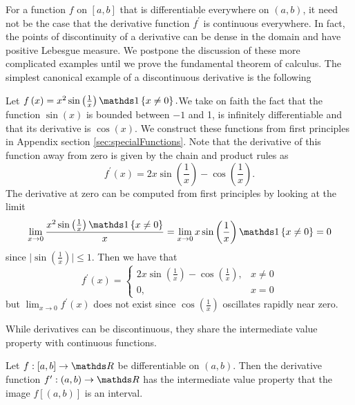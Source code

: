 For a function $f$ on $\left[a,b\right]$ that is differentiable
everywhere on $\left(a,b\right)$, it need not be the case that the
derivative function $f^{\prime}$ is continuous everywhere. In fact,
the points of discontinuity of a derivative can be dense in the domain
and have positive Lebesgue measure. We postpone the discussion of
these more complicated examples until we prove the fundamental theorem
of calculus. The simplest canonical example of a discontinuous derivative
is the following
\begin{example}
\label{exa:discontinuousDerivative}Let $f\left(x\right)=x^{2}\sin\left(\frac{1}{x}\right)\indicate\left\{ x\neq0\right\} .$We
take on faith the fact that the function $\sin\left(x\right)$ is
bounded between $-1$ and 1, is infinitely differentiable and that
its derivative is $\cos\left(x\right)$. We construct these functions
from first principles in Appendix section \ref{sec:specialFunctions}.
Note that the derivative of this function away from zero is given
by the chain and product rules as 
\[
f^{\prime}\left(x\right)=2x\sin\left(\frac{1}{x}\right)-\cos\left(\frac{1}{x}\right).
\]
The derivative at zero can be computed from first principles by looking
at the limit
\[
\lim_{x\to0}\frac{x^{2}\sin\left(\frac{1}{x}\right)\indicate\left\{ x\neq0\right\} }{x}=\lim_{x\to0}x\sin\left(\frac{1}{x}\right)\indicate\left\{ x\neq0\right\} =0
\]
since $\lvert\sin\left(\frac{1}{x}\right)\rvert\leq1$. Then we have
that 
\[
f^{\prime}\left(x\right)=\begin{cases}
2x\sin\left(\frac{1}{x}\right)-\cos\left(\frac{1}{x}\right), & x\neq0\\
0, & x=0
\end{cases}
\]
but $\lim_{x\to0}f^{\prime}\left(x\right)$ does not exist since $\cos\left(\frac{1}{x}\right)$
oscillates rapidly near zero.
\end{example}

While derivatives can be discontinuous, they share the intermediate
value property with continuous functions.
\begin{prop}
\label{prop:darbouxTheorem}Let $f:\left[a,b\right]\to\R$ be differentiable
on $\left(a,b\right).$ Then the derivative function $f^{\prime}:\left(a,b\right)\to\R$
has the intermediate value property that the image $f\left[\left(a,b\right)\right]$
is an interval.
\end{prop}

